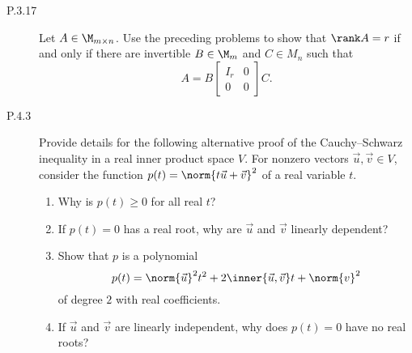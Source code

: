 \documentclass{homework}
\date{Tuesday 2/5}
\author{}
\begin{document}
\begin{description}
\item[P.3.17]
  Let \(A \in \M_{m\times n}\).  Use the preceding problems to show
  that \(\rank A = r\) if and only if there are invertible
  \(B \in \M_m\) and \(C \in M_n\) such that
  \[
    A = B
    \begin{bmatrix}
      I_r & 0 \\
      0   & 0
    \end{bmatrix}
    C.
  \]

  \begin{solution}

  \end{solution}

\item[P.4.3]
  Provide details for the following alternative proof of the
  Cauchy--Schwarz inequality in a real inner product space \(V\).  For
  nonzero vectors \(\vec u, \vec v \in V\), consider the function
  \(p(t) = \norm{t \vec u + \vec v}^2\) of a real variable \(t\).
  \begin{enumerate}
  \item Why is \(p(t) \ge 0\) for all real \(t\)?

    \begin{solution}

    \end{solution}

  \item If \(p(t) = 0\) has a real root, why are \(\vec u\) and
    \(\vec v\) linearly dependent?

    \begin{solution}

    \end{solution}

  \item Show that \(p\) is a polynomial
    \[
      p(t) =
      \norm{\vec u}^2 t^2        +
      2 \inner{\vec u, \vec v} t +
      \norm{v}^2
    \]
    of degree \(2\) with real coefficients.

    \begin{solution}

    \end{solution}

  \item If \(\vec u\) and \(\vec v\) are linearly independent, why
    does \(p(t) = 0\) have no real roots?

    \begin{solution}


\end{solution}
\end{enumerate}
\end{description}
\end{document}
